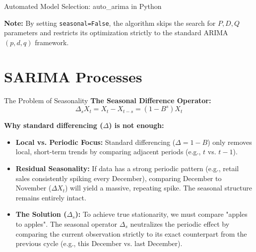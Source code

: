 \documentclass[aspectratio=169]{beamer}
\begin{document}
\begin{frame}[fragile]{Automated Model Selection: auto\_arima in Python}

\vspace{0.2cm}
\textbf{Note:} By setting \texttt{seasonal=False}, the algorithm skips the search for $P, D, Q$ parameters and restricts its optimization strictly to the standard ARIMA$(p,d,q)$ framework.
\end{frame}
\section{SARIMA Processes}

\begin{frame}{The Problem of Seasonality}
\textbf{The Seasonal Difference Operator:}
\[
\Delta_s X_t = X_t - X_{t-s} = (1 - B^s)X_t
\]

\textbf{Why standard differencing ($\Delta$) is not enough:}
\begin{itemize}
    \item \textbf{Local vs. Periodic Focus:} Standard differencing ($\Delta = 1 - B$) only removes local, short-term trends by comparing adjacent periods (e.g., $t$ vs. $t-1$).
    
    \vspace{0.2cm}
    
    \item \textbf{Residual Seasonality:} If data has a strong periodic pattern (e.g., retail sales consistently spiking every December), comparing December to November ($\Delta X_t$) will yield a massive, repeating spike. The seasonal structure remains entirely intact.
    
    \vspace{0.2cm}
    
    \item \textbf{The Solution ($\Delta_s$):} To achieve true stationarity, we must compare "apples to apples". The seasonal operator $\Delta_s$ neutralizes the periodic effect by comparing the current observation strictly to its exact counterpart from the previous cycle (e.g., this December vs. last December).
\end{itemize}
\end{frame}
\end{document}

